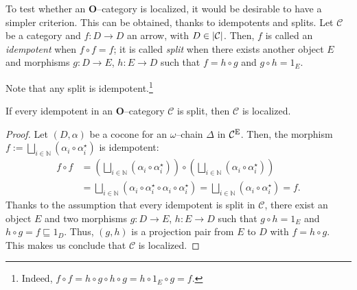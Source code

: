 To test whether an \(\mathbf{O}\)--category is localized, it would be desirable to have a simpler criterion. This can be obtained, thanks to idempotents and splits. Let \(\mathcal{C}\) be a category and \(f \colon D \to D\) an arrow, with \(D \in \lvert \mathcal{C} \rvert\). Then, \(f\) is called an \emph{idempotent} when \(f \circ f = f\); it is called \emph{split} when there exists another object \(E\) and morphisms \(g \colon D \to E\), \(h \colon E \to D\) such that \(f = h \circ g\) and \(g \circ h = 1_E\).
\begin{center}
\end{center}

Note that any split is idempotent.\footnote{Indeed, \(f \circ f = h \circ g \circ h \circ g = h \circ 1_E \circ g = f\).}

\begin{prp}
  If every idempotent in an \(\mathbf{O}\)--category \(\mathcal{C}\) is split, then \(\mathcal{C}\) is localized.
\end{prp}
\begin{proof}
  Let \((D,\alpha)\) be a cocone for an \(\omega{}\)--chain \(\Delta{}\) in \(\mathcal{C}^\textup{E}\).
  Then, the morphism \(f := \bigsqcup_{i \in \mathbb{N}}(\alpha_i \circ \alpha_i^\star)\) is idempotent:
  \begin{equation*}
    \begin{split}
      f \circ f &= (\bigsqcup_{i \in \mathbb{N}}(\alpha_i \circ \alpha_i^\star)) \circ (\bigsqcup_{i \in \mathbb{N}}(\alpha_i \circ \alpha_i^\star)) \\
      &= \bigsqcup_{i \in \mathbb{N}}(\alpha_i \circ \alpha_i^\star \circ \alpha_i \circ \alpha_i^\star)
      = \bigsqcup_{i \in \mathbb{N}}(\alpha_i \circ \alpha_i^\star) = f.
    \end{split}
  \end{equation*}
  Thanks to the assumption that every idempotent is split in \(\mathcal{C}\), there exist an object \(E\) and two morphisms \(g \colon D \to E\), \(h \colon E \to D\) such that \(g \circ h = 1_E\) and \(h \circ g = f \sqsubseteq 1_D\).
  Thus, \((g,h)\) is a projection pair from \(E\) to \(D\) with \(f = h \circ g\).
  This makes us conclude that \(\mathcal{C}\) is localized.
\end{proof}

